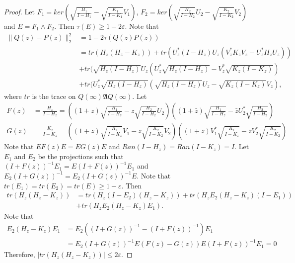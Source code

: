 \documentclass[a4paper,10pt]{amsart}
\newcommand{\AAA}{\mathfrak A}
\begin{document}
\begin{proof}
    Let $F_1 = ker(\sqrt{\frac{H_1}{I-H_1}} - 
    \sqrt{\frac{K_1}{I-K_1}}V_1)$, 
    $F_2 = ker(\sqrt{\frac{H_2}{I-H_2}}U_2 - 
    \sqrt{\frac{K_2}{I-K_2}}V_2)$ and $E = F_1 \wedge F_2$. Then
    $\tau(E) \geq 1 - 2\varepsilon$. Note that
    \begin{align*}
        \|Q(z) - P(z)\|_{2}^{2} &= 1 - 2\tau(Q(z)P(z))\\ 
                                &= tr(H_{z}(H_z - K_z))
    + tr(U^{*}_{z}(I-H_z)U_{z}(V^{*}_{z}K_{z}V_{z} - U^{*}_{z}H_{z}U_{z}))\\
       &+ tr(\sqrt{H_{z}(I-H_{z})}U_{z}(U^{*}_{z}\sqrt{H_{z}(I-H_{z})}
        - V^{*}_{z} \sqrt{K_{z}(I-K_{z})}) \\
        &+ tr(U^{*}_{z}\sqrt{H_{z}(I-H_{z})}(\sqrt{H_{z}(I-H_{z})}U_{z}
        - \sqrt{K_{z}(I-K_{z})}V_{z}),
    \end{align*}
    where $tr$ is the trace on $Q(\infty)\AAA Q(\infty)$.
    Let
    \begin{align*}
        F(z) &= \frac{H_z}{I-H_z} = \left((1+z)\sqrt{\frac{H_1}{I-H_z}}
        -z\sqrt{\frac{H_2}{I-H_2}}U_{2} \right)
        \left((1+\bar{z})\sqrt{\frac{H_1}{I-H_z}}
        -\bar{z}U^{*}_{2}\sqrt{\frac{H_2}{I-H_2}} \right)\\
        G(z) &= \frac{K_z}{I-K_z} = \left((1+z)\sqrt{\frac{K_1}{I-K_z}}V_1
        -z\sqrt{\frac{K_2}{I-K_2}}V_{2} \right)
        \left((1+\bar{z})V^{*}_{1}\sqrt{\frac{K_1}{I-K_z}}
        -\bar{z}V^{*}_{2}\sqrt{\frac{K_2}{I-K_2}} \right)
    \end{align*}
    Note that $E F(z)E = E G(z) E$ and $Ran(I-H_z)= 
    Ran(I-K_z) = I$. 
    Let $E_1$ and $E_2$ be the projections
    such that $(I+F(z))^{-1}E_1 = E(I+F(z))^{-1}E_1$ and 
    $E_2(I+G(z))^{-1} = E_2(I+G(z))^{-1}E$.
    Note that $tr(E_1) = tr(E_2) = tr(E) \geq 1 - \varepsilon$.
    Then
    \begin{align*}
        tr(H_z(H_z-K_z))
        &=tr(H_z(I-E_2)(H_z - K_z)) + tr(H_z E_2 (H_z-K_z)(I-E_1))\\ 
        &+tr(H_z E_2(H_z - K_z)E_1).
    \end{align*}
    Note that
    \begin{align*}
        E_2(H_z - K_z)E_1 &= E_2((I+G(z))^{-1} - (I+F(z))^{-1})E_1\\
                          &= E_2(I+G(z))^{-1}E(F(z) - G(z))E(I+F(z))^{-1}E_1
                            = 0
    \end{align*}
    Therefore, $|tr(H_z(H_z-K_z))| \leq 2\varepsilon$.

\end{proof}
\end{document}
